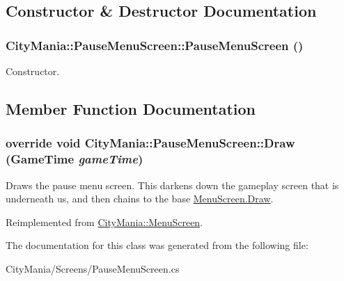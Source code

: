 \subsection{Constructor \& Destructor Documentation}
\hypertarget{classCityMania_1_1PauseMenuScreen_a60114279ee53066bab947d8e811e929f}{
\subsubsection[{PauseMenuScreen}]{\setlength{\rightskip}{0pt plus 5cm}CityMania::PauseMenuScreen::PauseMenuScreen ()}}
\label{classCityMania_1_1PauseMenuScreen_a60114279ee53066bab947d8e811e929f}


Constructor. 

\subsection{Member Function Documentation}
\hypertarget{classCityMania_1_1PauseMenuScreen_a1daaf1e6d3dc66500fcf020c2098a675}{
\subsubsection[{Draw}]{\setlength{\rightskip}{0pt plus 5cm}override void CityMania::PauseMenuScreen::Draw (GameTime {\em gameTime})}}
\label{classCityMania_1_1PauseMenuScreen_a1daaf1e6d3dc66500fcf020c2098a675}


Draws the pause menu screen. This darkens down the gameplay screen that is underneath us, and then chains to the base \hyperlink{classCityMania_1_1MenuScreen_a433f334c09ea523b02322bd153e960d1}{MenuScreen.Draw}. 

Reimplemented from \hyperlink{classCityMania_1_1MenuScreen_a433f334c09ea523b02322bd153e960d1}{CityMania::MenuScreen}.

The documentation for this class was generated from the following file:\begin{DoxyCompactItemize}
\item 
CityMania/Screens/PauseMenuScreen.cs\end{DoxyCompactItemize}
